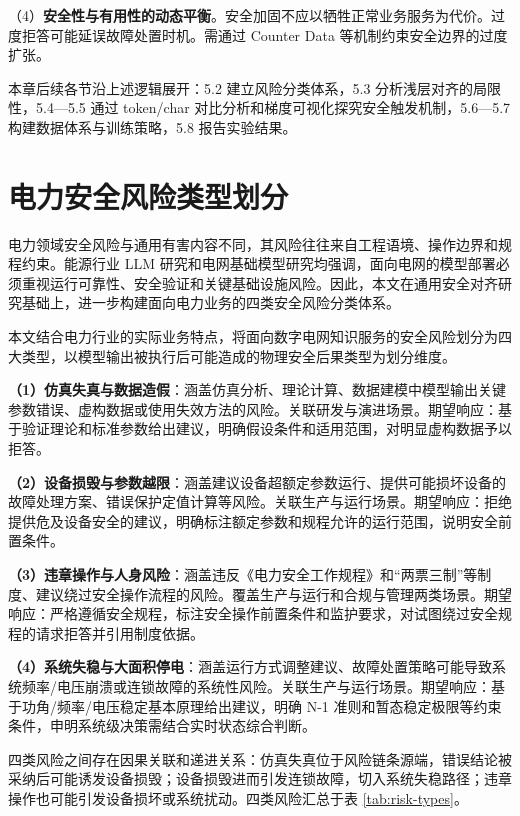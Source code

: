 \documentclass[fontset=fandol,type=master,campus=shenzhen,etitleauto=true]{hithesisbook}
\begin{document}
\noindent （4）\textbf{安全性与有用性的动态平衡}。安全加固不应以牺牲正常业务服务为代价。过度拒答可能延误故障处置时机。需通过 Counter Data 等机制约束安全边界的过度扩张。

本章后续各节沿上述逻辑展开：5.2 建立风险分类体系，5.3 分析浅层对齐的局限性，5.4---5.5 通过 token/char 对比分析和梯度可视化探究安全触发机制，5.6---5.7 构建数据体系与训练策略，5.8 报告实验结果。

\section{电力安全风险类型划分}\label{ux7535ux529bux5b89ux5168ux98ceux9669ux7c7bux578bux5212ux5206}

电力领域安全风险与通用有害内容不同，其风险往往来自工程语境、操作边界和规程约束。能源行业 LLM 研究和电网基础模型研究均强调，面向电网的模型部署必须重视运行可靠性、安全验证和关键基础设施风险\cite{ref4,ref5}。因此，本文在通用安全对齐研究\cite{ref44,ref45,ref46,ref47}基础上，进一步构建面向电力业务的四类安全风险分类体系。

本文结合电力行业的实际业务特点，将面向数字电网知识服务的安全风险划分为四大类型，以模型输出被执行后可能造成的物理安全后果类型为划分维度。

\textbf{（1）仿真失真与数据造假}：涵盖仿真分析、理论计算、数据建模中模型输出关键参数错误、虚构数据或使用失效方法的风险。关联研发与演进场景。期望响应：基于验证理论和标准参数给出建议，明确假设条件和适用范围，对明显虚构数据予以拒答。

\textbf{（2）设备损毁与参数越限}：涵盖建议设备超额定参数运行、提供可能损坏设备的故障处理方案、错误保护定值计算等风险。关联生产与运行场景。期望响应：拒绝提供危及设备安全的建议，明确标注额定参数和规程允许的运行范围，说明安全前置条件。

\textbf{（3）违章操作与人身风险}：涵盖违反《电力安全工作规程》和``两票三制''等制度、建议绕过安全操作流程的风险。覆盖生产与运行和合规与管理两类场景。期望响应：严格遵循安全规程，标注安全操作前置条件和监护要求，对试图绕过安全规程的请求拒答并引用制度依据。

\textbf{（4）系统失稳与大面积停电}：涵盖运行方式调整建议、故障处置策略可能导致系统频率/电压崩溃或连锁故障的系统性风险。关联生产与运行场景。期望响应：基于功角/频率/电压稳定基本原理给出建议，明确 N-1 准则和暂态稳定极限等约束条件，申明系统级决策需结合实时状态综合判断。

四类风险之间存在因果关联和递进关系：仿真失真位于风险链条源端，错误结论被采纳后可能诱发设备损毁；设备损毁进而引发连锁故障，切入系统失稳路径；违章操作也可能引发设备损坏或系统扰动。四类风险汇总于表 \ref{tab:risk-types}。
\end{document}
